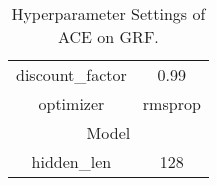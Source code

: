 \documentclass[letterpaper]{article} \usepackage{aaai23}  \usepackage{times}  \usepackage{helvet}  \usepackage{courier}  \usepackage[hyphens]{url}  \usepackage{graphicx} \urlstyle{rm} \def\UrlFont{\rm}  \usepackage{natbib}  \usepackage{caption} \frenchspacing  \setlength{\pdfpagewidth}{8.5in} \setlength{\pdfpageheight}{11in} \usepackage{algorithm}
\begin{document}
\begin{table}[h]
{\begin{tabular}{cc}
\multicolumn{1}{c|}{discount\_factor}      & 0.99                             \\
\multicolumn{1}{c|}{optimizer}             & rmsprop                          \\ \midrule
\multicolumn{2}{c}{Model}                                             \\ \midrule
\multicolumn{1}{c|}{hidden\_len}           & 128                              \\
\bottomrule
\end{tabular}}
\vspace{-0.2cm}
\caption{Hyperparameter Settings of ACE on GRF.}
\vspace{-3ex}
\label{appendix:grf_hyperparameter}
\end{table}
 
\end{document}
